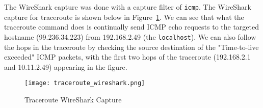 The WireShark capture was done with a capture filter of \texttt{icmp}. The WireShark capture for traceroute is shown below in Figure~\ref{fig:tracert}. We can see that what the traceroute command does is continually send ICMP echo requests to the targeted hostname (99.236.34.223) from 192.168.2.49 (the \texttt{localhost}). We can also follow the hops in the traceroute by checking the source destination of the "Time-to-live exceeded" ICMP packets, with the first two hops of the traceroute (192.168.2.1 and 10.11.2.49) appearing in the figure.

\begin{figure}[htp]
\centering
\caption[tracert]{Traceroute WireShark Capture}\label{fig:tracert}
\texttt{[image: traceroute\_wireshark.png]}
\end{figure}